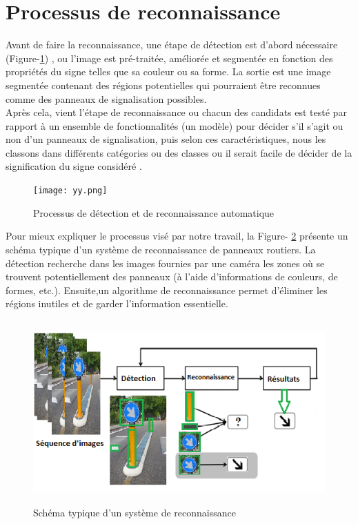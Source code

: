 \section{Processus de reconnaissance}

Avant de faire la reconnaissance, une étape de détection est d'abord nécessaire (Figure-\ref{fig:processus de}) \cite{10}, ou l’image est pré-traitée, améliorée et segmentée en fonction des propriétés du signe telles que sa couleur ou sa forme. La sortie est une image segmentée contenant des régions potentielles qui pourraient être reconnues comme des panneaux de signalisation possibles.\\

Après cela, vient l’étape de reconnaissance ou chacun des candidats est testé par rapport à un ensemble de fonctionnalités (un modèle) pour décider s’il s’agit ou non d'un panneaux de signalisation, puis selon ces caractéristiques, nous les classons dans différents catégories ou des classes  ou il serait facile de décider de la signification du signe considéré \cite{10}.\\
 
  \begin{figure}[h!]
        \centering
        \texttt{[image: yy.png]}
        \caption{Processus de détection et de reconnaissance automatique}
        \label{fig:processus de}
\end{figure}
\newpage
Pour mieux expliquer le processus visé par notre travail, la Figure- \ref{fig:schma} présente un schéma typique d’un système de reconnaissance de panneaux routiers. La détection recherche dans les images fournies par une caméra les zones où se trouvent potentiellement des panneaux  (à l’aide d’informations de couleurs, de formes, etc.). Ensuite,un algorithme de reconnaissance permet d’éliminer les régions inutiles et de garder l'information essentielle.\\
\begin{figure}[h]
        \centering
        \includegraphics[width=12cm,height=7cm]{images/proces.png}
        \caption{Schéma typique d’un système de reconnaissance}
        \label{fig:schma}
        \end{figure}
\newpage     
